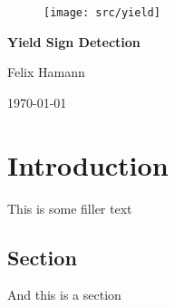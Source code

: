 \documentclass{report}
\begin{document}
%
%


{\centering

  \begin{figure}
    \vspace{3cm}

    \centering
    \texttt{[image: src/yield]}

    \vspace{4cm}
  \end{figure}


  {\Huge\textbf{Yield Sign Detection}}
  \vspace{.4cm}

  Felix Hamann

  \vspace{.2cm}

  \today

}


%
%

\tableofcontents


\chapter{Introduction}

This is some filler text

\section{Section}

And this is a section
\end{document}

